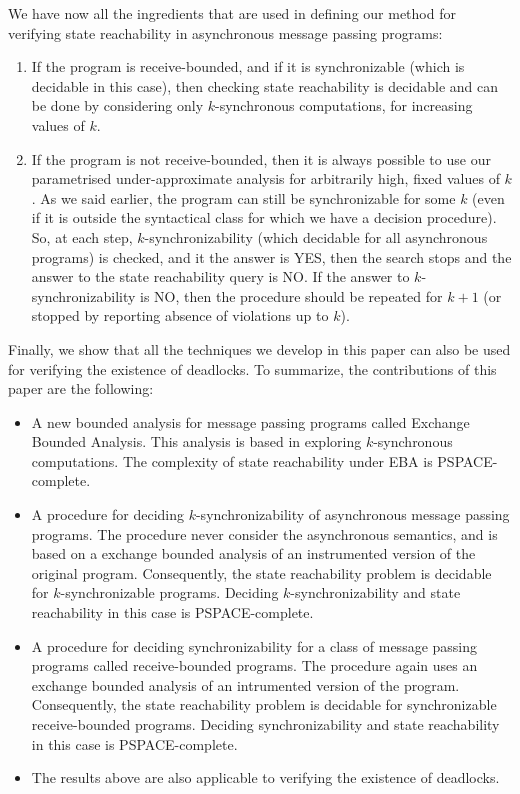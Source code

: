We have now all the ingredients that are used in defining our method for verifying state reachability in asynchronous message passing programs: 
\begin{enumerate}
\item
If the program is receive-bounded, and if it is synchronizable (which is decidable in this case), then checking state reachability is decidable and can be done by considering only $k$-synchronous computations, for increasing values of $k$. 
\item 
If the program is not receive-bounded, then it is always possible to use our parametrised under-approximate analysis for arbitrarily high, fixed values of $k$. As we said earlier, the program can still be synchronizable for some $k$ (even if it is outside the syntactical class for which we have a decision procedure). So, at each step, $k$-synchronizability (which decidable for all asynchronous programs) is checked, and it the answer is YES, then the search stops and the answer to the state reachability query is NO. If the answer to $k$-synchronizability is NO, then the procedure should be repeated for $k+1$ (or stopped by reporting absence of violations up to $k$).  
\end{enumerate}

Finally, we show that all the techniques we develop in this paper can also be used for verifying the existence of deadlocks. To summarize, the contributions of this paper are the following:

\begin{itemize}
\item A new bounded analysis for message passing programs called Exchange Bounded Analysis. This analysis is based in exploring $k$-synchronous computations. The complexity of state reachability under EBA is PSPACE-complete. 

\item A procedure for deciding $k$-synchronizability of asynchronous message passing programs. The procedure never consider the asynchronous semantics, and is based on a exchange bounded analysis of an instrumented version of the original program. Consequently, the state reachability problem is decidable for $k$-synchronizable programs. Deciding  $k$-synchronizability and state reachability in this case is PSPACE-complete. 

\item A procedure for deciding synchronizability for a class of message passing programs called receive-bounded programs. The procedure again uses an exchange bounded analysis of an intrumented version of the program. Consequently, the state reachability problem is decidable for synchronizable receive-bounded programs.  Deciding  synchronizability and state reachability in this case is PSPACE-complete. 

\item The results above are also applicable to verifying the existence of deadlocks. 

\end{itemize}
